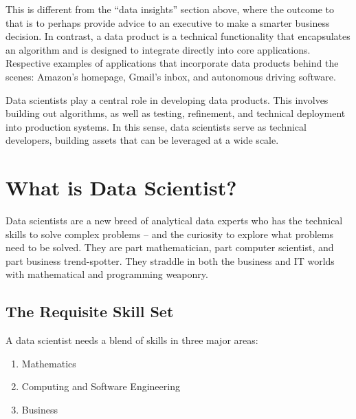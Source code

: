 \documentclass[
]{book}
\providecommand{\tightlist}{%
  \setlength{\itemsep}{0pt}\setlength{\parskip}{0pt}}
\begin{document}
This is different from the ``data insights'' section above, where the outcome to that is to perhaps provide advice to an executive to make a smarter business decision. In contrast, a data product is a technical functionality that encapsulates an algorithm and is designed to integrate directly into core applications. Respective examples of applications that incorporate data products behind the scenes: Amazon's homepage, Gmail's inbox, and autonomous driving software.

Data scientists play a central role in developing data products. This involves building out algorithms, as well as testing, refinement, and technical deployment into production systems. In this sense, data scientists serve as technical developers, building assets that can be leveraged at a wide scale.

\hypertarget{what-is-data-scientist}{%
\section{What is Data Scientist?}\label{what-is-data-scientist}}

Data scientists are a new breed of analytical data experts who has the technical skills to solve complex problems -- and the curiosity to explore what problems need to be solved. They are part mathematician, part computer scientist, and part business trend-spotter. They straddle in both the business and IT worlds with mathematical and programming weaponry.

\hypertarget{the-requisite-skill-set}{%
\subsection*{The Requisite Skill Set}\label{the-requisite-skill-set}}


A data scientist needs a blend of skills in three major areas:

\begin{enumerate}
\def\labelenumi{\arabic{enumi}.}
\tightlist
\item
  Mathematics
\item
  Computing and Software Engineering
\item
  Business
\end{enumerate}
\end{document}
